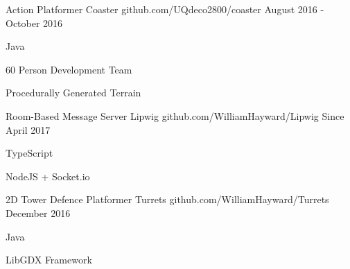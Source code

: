 


\begin{cventries}


\cventry
{Action Platformer} %
{Coaster} %
{github.com/UQdeco2800/coaster} %
{August 2016 - October 2016} %
{ %
\begin{cvitems}
\item Java
\item 60 Person Development Team
\item Procedurally Generated Terrain
\end{cvitems}
}


\cventry
{Room-Based Message Server} %
{Lipwig} %
{github.com/WilliamHayward/Lipwig} %
{Since April 2017} %
{ %
\begin{cvitems}
\item TypeScript
\item NodeJS + Socket.io
\end{cvitems}
}


\cventry
{2D Tower Defence Platformer} %
{Turrets} %
{github.com/WilliamHayward/Turrets} %
{December 2016} %
{ %
\begin{cvitems}
\item Java
\item LibGDX Framework
\end{cvitems}
}


\end{cventries}